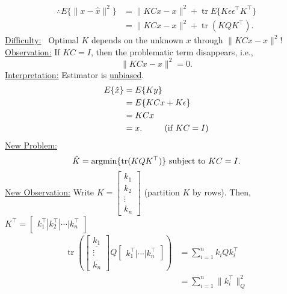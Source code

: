 \documentclass[letterpaper]{article}
\begin{document}
    \begin{align*}
        \therefore E\{\|x-\hat{x}\|^2\}&=\|KCx-x\|^2+\operatorname{tr}E\{K\epsilon\epsilon^\top K^\top\}\\
        &=\|KCx-x\|^2 + \operatorname{tr}(KQK^\top ).
    \end{align*}
    \underline{Difficulty:}~ Optimal $K$ depends on the unknown $x$ through $\|KCx-x\|^2$!
    \newline\newline
    \underline{Observation:} If $KC=I$, then the problematic term disappears, i.e.,
    \begin{equation*}
        \|KCx-x\|^2=0.
    \end{equation*}
    \underline{Interpretation:} Estimator is \underline{unbiased}.
    \begin{align*}
        E\{\hat{x}\}&=E\{Ky\}\\
        &=E\{KCx+K\epsilon\}\\
        &=KCx\\
        &=x.\ \ \ \ \ \ \ \ (\textnormal{if }KC=I)
    \end{align*}
    \underline{New Problem:}~
    \begin{equation*}
        \hat{K}=\operatorname{argmin}\{\operatorname{tr}(KQK^\top )\}\textnormal{ subject to }KC=I.
    \end{equation*}
    \underline{New Observation:}
    \newline\newline
    Write $K = \begin{bmatrix}
        k_1\\
        k_2\\
        \vdots\\
        k_n
    \end{bmatrix}$ (partition $K$ by rows).
    \newline\newline
    Then, $K^\top =\begin{bmatrix}
        k_1^\top | k_2^\top  | \dotsb | k_n^\top
    \end{bmatrix}$
    \begin{align*}
        \operatorname{tr}\left(\begin{bmatrix}
            \underline{k_1}\\
            \vdots\\
            \overline{k_n}
            \end{bmatrix}Q\begin{bmatrix}k_1^\top|\dotsb|k_n^\top\end{bmatrix}\right) &=\sum^{n}_{i=1}k_iQk_i^\top\\
        &=\sum^{n}_{i=1}\|k_i^\top\|_Q^2
    \end{align*}
\end{document}
